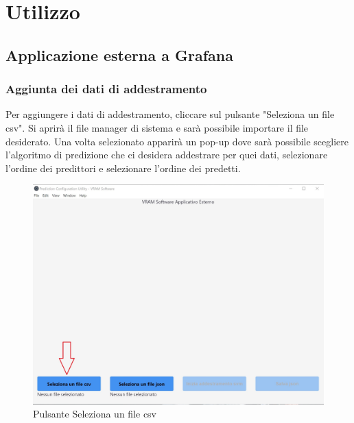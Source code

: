 \section{Utilizzo}
	\subsection{Applicazione esterna a Grafana}
		\subsubsection{Aggiunta dei dati di addestramento}
		Per aggiungere i dati di addestramento, cliccare sul pulsante "Seleziona un file csv".
		Si aprirà il file manager di sistema e sarà possibile importare il file desiderato. Una volta selezionato apparirà un pop-up dove sarà possibile scegliere l'algoritmo di predizione che ci desidera addestrare per quei dati, selezionare l'ordine dei predittori e selezionare l'ordine dei predetti.
		\mbox{}
		\begin{figure} [H]
			\begin{center}
				\includegraphics[width=\linewidth]{./img/1.jpg}
			\end{center}
			\caption{Pulsante Seleziona un file csv}
		\end{figure}
		\mbox{}
		\mbox{}
